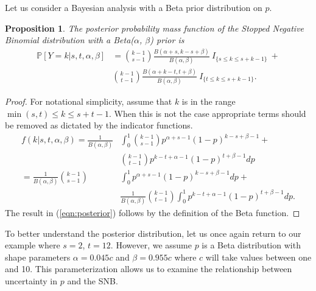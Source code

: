 \documentclass[review]{elsarticle}
\newtheorem{prop}{Proposition}
\begin{document}
Let us consider a Bayesian analysis with a Beta prior distribution on $p$.
\begin{prop} \label{prop:bayesian}
The posterior probability mass function of the Stopped Negative Binomial 
distribution with a 
Beta($\alpha$, $\beta$) prior is
\begin{align} \label{eqn:posterior}
\mathbb{P} [Y = k | s, t, \alpha, \beta ] &= 
  {k-1 \choose s-1} \frac{B\left(\alpha+s, k-s+\beta \right)}{B(\alpha, \beta)} 
    \ I_{\{s \leq k \leq s+k-1\}} \ + \nonumber \\
  & {k-1 \choose t-1} 
    \frac{B\left(\alpha + k - t, t+\beta\right)}{B(\alpha, \beta)} 
    \ I_{\{t \leq k \leq s+k-1\}}.
\end{align}
\end{prop}
\begin{proof}
For notational simplicity, assume that $k$ is in the range
$\min(s,t) \leq k \leq s+t-1$. When 
this is not the case appropriate terms should be removed as dictated by the indicator functions.
\begin{align*}
f(k | s, t, \alpha, \beta) = \frac{1}{B(\alpha, \beta)} & \int_0^1 {k-1 \choose s-1} p^{\alpha +s -1} \left(1-p\right)^{k-s+\beta-1} + \\
 & {k-1 \choose t-1} p^{k-t+\alpha-1}\left(1-p\right)^{t+\beta-1} dp \\
= \frac{1}{B(\alpha, \beta)}  {k-1 \choose s-1} & \int_0^1  p^{\alpha +s -1} \left(1-p\right)^{k-s+\beta-1} dp + \\
 & \frac{1}{B(\alpha, \beta)} {k-1 \choose t-1} \int_0^1  p^{k-t+\alpha-1}\left(1-p\right)^{t+\beta-1} dp.
\end{align*}
The result in (\ref{eqn:posterior}) follows by the definition of the 
Beta function.
\end{proof}

To better understand the posterior distribution, let us once again return to 
our example where $s=2$, $t=12$. However, we assume $p$ is a Beta distribution
with shape parameters $\alpha = 0.045 c$ and 
$\beta = 0.955 c$ where $c$ will take values between one and 10. 
This parameterization allows us to examine the relationship between 
uncertainty in $p$ and the SNB.
\end{document}
